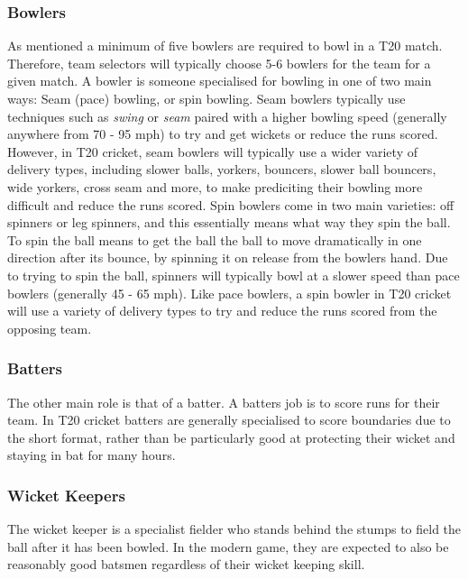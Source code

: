 \documentclass[12pt,a4paper]{report}
\theoremstyle{definition}
\begin{document}
\subsubsection{Bowlers}

As mentioned a minimum of five bowlers are required to bowl in a T20 match.  
Therefore, team selectors will typically choose 5-6 bowlers for the team for a given match.
A bowler is someone specialised for bowling in one of two main ways: Seam (pace) bowling, or spin bowling.
Seam bowlers typically use techniques such as \emph{swing} or \emph{seam} paired with a higher bowling speed (generally anywhere from 70 - 95 mph) to try and get wickets or reduce the runs scored.
However, in T20 cricket, seam bowlers will typically use a wider variety of delivery types, including slower balls, yorkers, bouncers, slower ball bouncers, wide yorkers, cross seam and more, to make prediciting their bowling more difficult and reduce the runs scored. 
Spin bowlers come in two main varieties: off spinners or leg spinners, and this essentially means what way they spin the ball. 
To spin the ball means to get the ball the ball to move dramatically in one direction after its bounce, by spinning it on release from the bowlers hand.
Due to trying to spin the ball, spinners will typically bowl at a slower speed than pace bowlers (generally 45 - 65 mph).
Like pace bowlers, a spin bowler in T20 cricket will use a variety of delivery types to try and reduce the runs scored from the opposing team.

\subsubsection{Batters}

The other main role is that of a batter.
A batters job is to score runs for their team.
In T20 cricket batters are generally specialised to score boundaries due to the short format, rather than be particularly good at protecting their wicket and staying in bat for many hours.

\subsubsection{Wicket Keepers}

The wicket keeper is a specialist fielder who stands behind the stumps to field the ball after it has been bowled.
In the modern game, they are expected to also be reasonably good batsmen regardless of their wicket keeping skill.
\end{document}
